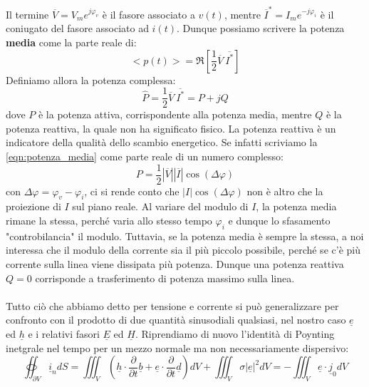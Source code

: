 \documentclass{book}
\begin{document}
        Il termine $\overline{V}=V_{m}e^{j \varphi_{v}}$ è il fasore associato a $v(t)$, mentre $\overline{I}^{*}=I_{m}e^{-j\varphi_{i}}$ è il
        coniugato del fasore associato ad $i(t)$. Dunque possiamo scrivere la potenza \textbf{media} come la parte reale di:
        \begin{equation}
                <p(t)>=\Re[\frac{1}{2}\overline{V} \ \overline{I^{*}}]
        \end{equation}
        Definiamo allora la potenza complessa:
        \begin{equation}
            \label{eqn:potenza_media}
            \hat{P} = \frac{1}{2}\overline{V} \ \overline{I^{*}} = P+jQ
        \end{equation}
        dove $P$ è la potenza attiva, corrispondente alla potenza media, mentre $Q$ è la potenza reattiva,
        la quale non ha significato fisico. La potenza reattiva è un indicatore della qualità dello scambio energetico.
        Se infatti scriviamo la \ref{eqn:potenza_media} come parte reale di un numero complesso:
        \begin{equation}
            P=\frac{1}{2}|\overline{V}||\overline{I}|\cos{(\Delta \varphi)}
        \end{equation}
        con $\Delta \varphi = \varphi_{v}-\varphi_{i}$, ci si rende conto che $|I|\cos{(\Delta \varphi)}$ non è altro
        che la proiezione di $I$ sul piano reale. Al variare del modulo di $I$, la potenza media rimane la stessa, perché varia
        allo stesso tempo $\varphi_{i}$ e dunque lo sfasamento "controbilancia" il modulo. Tuttavia, se la potenza media è sempre la stessa,
        a noi interessa che il modulo della corrente sia il più piccolo possibile, perché se c'è più corrente sulla
        linea viene dissipata più potenza. Dunque una potenza reattiva $Q=0$ corrisponde a trasferimento di potenza massimo sulla linea. \\ \\
        Tutto ciò che abbiamo detto per tensione e corrente si può generalizzare per confronto con il prodotto di due quantità sinusodiali
        qualsiasi, nel nostro caso $\underline{e}$ ed $\underline{h}$ e i relativi fasori $\underline{E}$ ed $\underline{H}$.
        Riprendiamo di nuovo l'identità di Poynting  inetgrale nel tempo per un mezzo normale ma non necessariamente dispersivo:
        \begin{equation}
            \oiint_{\partial V} \underline{i}_{n}dS = \iiint_{V} (\underline{h}\cdot \frac{\partial}{\partial t}\underline{b}+\underline{e}\cdot \frac{\partial}{\partial t}\underline{d})dV+
            \iiint_{V} \sigma |\underline{e}|^{2}dV = - \iiint_{V} \underline{e} \cdot \underline{j}_{0}dV
        \end{equation}
\end{document}
